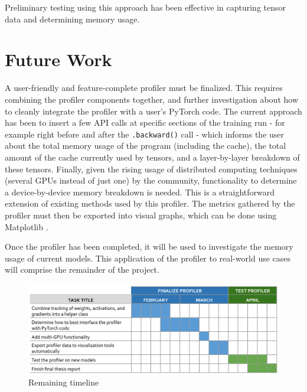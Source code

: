 \documentclass[12pt,letterpaper]{article}
\begin{document}
Preliminary testing using this approach has been effective in capturing tensor data and determining memory usage.
\par 

\section{Future Work}
\label{future_work}
A user-friendly and feature-complete profiler must be finalized. This requires combining the profiler components together, and further investigation about how to cleanly integrate the profiler with a user's PyTorch code. The current approach has been to insert a few API calls at specific sections of the training run - for example right before and after the \texttt{.backward()} call - which informs the user about the total memory usage of the program (including the cache), the total amount of the cache currently used by tensors, and a layer-by-layer breakdown of these tensors. Finally, given the rising usage of distributed computing techniques (several GPUs instead of just one) by the community, functionality to determine a device-by-device memory breakdown is needed. This is a straightforward extension of existing methods used by this profiler. The metrics gathered by the profiler must then be exported into visual graphs, which can be done using Matplotlib \cite{matplotlib}.
\par

Once the profiler has been completed, it will be used to investigate the memory usage of current models. This application of the profiler to real-world use cases will comprise the remainder of the project.
\begin{figure}[ht]
\centering
\includegraphics[width=.9\textwidth]{remaining_work_schedule.png}
\captionsetup{width=0.7\linewidth}
\caption{Remaining timeline}
\label{fig:thesis_timeline}
\end{figure}
\end{document}
